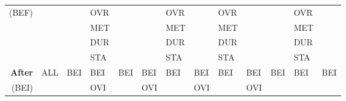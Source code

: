 \documentclass[11pt]{report}
\newenvironment{vvarmargin}[2]
{
  \begin{list}{}
  {
    \setlength{\topsep}{0pt}
    \setlength{\leftmargin}{0pt}
    \setlength{\rightmargin}{0pt}
    \setlength{\listparindent}{\parindent}
    \setlength{\itemindent}{\parindent}
    \setlength{\parsep}{0pt plus 1pt}
    \addtolength{\leftmargin}{#1}\addtolength{\rightmargin}{#2}
  }
  \item
}
{
  \end{list}
}
\begin{document}
\begin{table}[p]
\begin{vvarmargin}{-4cm}{-4cm}
\begin{center}
\begin{tabular}[t]{|r|l|l|l|l|l|l|l|l|l|l|l|l|}
                (BEF)                   &                         &                         & OVR                     &                         &                         & OVR                     &                         & OVR                     &                         &                         & OVR                     &                         \\ 
                                        &                         &                         & MET                     &                         &                         & MET                     &                         & MET                     &                         &                         & MET                     &                         \\ 
                                        &                         &                         & DUR                     &                         &                         & DUR                     &                         & DUR                     &                         &                         & DUR                     &                         \\
                                        &                         &                         & STA                     &                         &                         & STA                     &                         & STA                     &                         &                         & STA                     &                         \\
                \hline                                                                                                                                                                                                                                                                                                                                         
                \textbf{After}          & ALL                     & BEI                     & BEI                     & BEI                     & BEI                     & BEI                     & BEI                     & BEI                     & BEI                     & BEI                     & BEI                     & BEI                     \\
                (BEI)                   &                         &                         & OVI                     &                         & OVI                     &                         & OVI                     &                         & OVI                     &                         &                         &                         \\

\end{tabular}
\end{center}
\end{vvarmargin}
\end{table}
\end{document}
